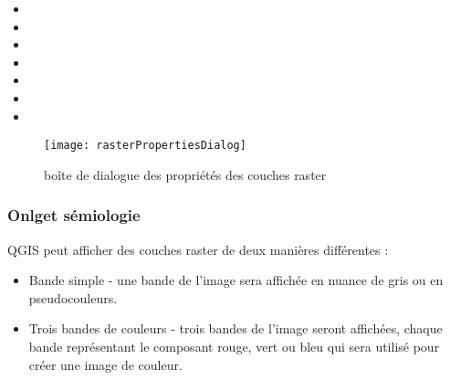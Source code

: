 \begin{itemize}
 \item {}
 \item {}
 \item {}
 \item {}
 \item {}
 \item {}
 \item {}
\end{itemize}

\begin{figure}[h]
  \begin{center}
   \caption{boîte de dialogue des propriétés des couches raster
\nixcaption}\label{fig:raster_properties}\smallskip
   \texttt{[image: rasterPropertiesDialog]}
\end{center}
\end{figure}

\subsubsection{Onlget sémiologie}\label{label_sombology}

QGIS peut afficher des couches raster de deux manières différentes
:

\begin{itemize}
\item Bande simple - une bande de l'image sera affichée en nuance de gris ou en
pseudocouleurs.
\item Trois bandes de couleurs - trois bandes de l'image seront affichées,
chaque bande représentant le composant rouge, vert ou bleu qui sera utilisé
pour créer une image de couleur.
\end{itemize}

